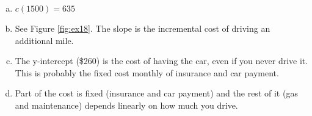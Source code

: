 \documentclass[letterpaper, landscape]{exam}
\begin{document}
\begin{description}
\begin{enumerate}[(a)]
          \item $c(1500) = 635$

          \item See Figure \ref{fig:ex18}. The slope is the incremental cost of
            driving an additional mile.

          \item The y-intercept (\$260) is the cost of having the car, even if
            you never drive it. This is probably the fixed cost monthly of
            insurance and car payment.

          \item Part of the cost is fixed (insurance and car payment) and the
            rest of it (gas and maintenance) depends linearly on how much you
            drive.
        \end{enumerate}
        
      \item 
    \end{description}
\end{document}
